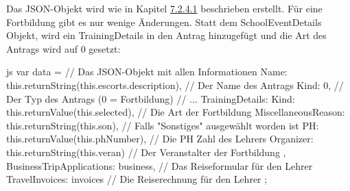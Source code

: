 Das JSON-Objekt wird wie in Kapitel \hyperref[code_submit_data]{7.2.4.1} beschrieben erstellt. Für eine Fortbildung gibt es nur wenige Änderungen.
Statt dem SchoolEventDetails Objekt, wird ein TrainingDetails in den Antrag hinzugefügt und die Art des Antrags wird auf 0 gesetzt:
\begin{code}{js}
var data = {		// Das JSON-Objekt mit allen Informationen
	Name: this.returnString(this.escorts.description),	// Der Name des Antrags
	Kind: 0,	// Der Typ des Antrags (0 = Fortbildung)
	// ...
	TrainingDetails: {
		Kind: this.returnValue(this.selected),	// Die Art der Fortbildung
		MiscellaneousReason: this.returnString(this.son),	// Falls "Sonstiges" ausgewählt worden ist
		PH: this.returnValue(this.phNumber),	// Die PH Zahl des Lehrers
		Organizer: this.returnString(this.veran)	// Der Veranstalter der Fortbildung
	},
	BusinessTripApplications: business,	// Das Reiseformular für den Lehrer
	TravelInvoices: invoices	// Die Reiserechnung für den Lehrer
};
\end{code}
~\\
\newpage
